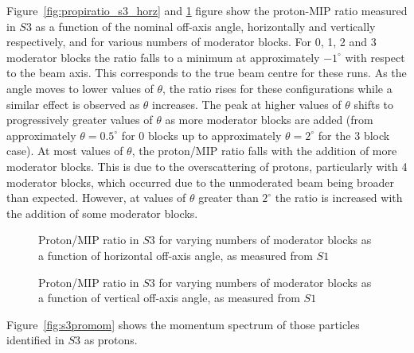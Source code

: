   Figure~\ref{fig:propiratio_s3_horz} and \ref{fig:propiratio_s3_vert} figure show the proton-MIP ratio measured in $\mathit{S3}$ as a function of the nominal off-axis angle, horizontally and vertically respectively, and for various numbers of moderator blocks.
  For 0, 1, 2 and 3 moderator blocks the ratio falls to a minimum at approximately $-1^{\circ}$ with respect to the beam axis. This corresponds to the true beam centre for these runs.
  As the angle moves to lower values of $\theta$, the ratio rises for these configurations while a similar effect is observed as $\theta$ increases.
  The peak at higher values of $\theta$ shifts to progressively greater values of $\theta$ as more moderator blocks are added (from approximately $\theta = 0.5^{\circ}$ for 0 blocks up to approximately $\theta = 2^{\circ}$ for the 3 block case).
  At most values of $\theta$, the proton/MIP ratio falls with the addition of more moderator blocks. 
  This is due to the overscattering of protons, particularly with 4 moderator blocks, which occurred due to the unmoderated beam being broader than expected.
  However, at values of $\theta$ greater than $2^{\circ}$ the ratio is increased with the addition of some moderator blocks.
  
  \begin{figure}[!ht]
    \begin{minipage}[t]{0.48\textwidth}
      \begin{adjustbox}{max totalsize={\textwidth}{.35\textheight}, center}
	
      \end{adjustbox}
      \caption{Proton/MIP ratio in $\mathit{S3}$ for varying numbers of moderator blocks as a function of horizontal off-axis angle, as measured from $\mathit{S1}$}
      \label{fig:propiratio_s3_horz}
    \end{minipage}
    \hspace{0.3cm}
    \begin{minipage}[t]{0.48\textwidth}
      \begin{adjustbox}{max totalsize={\textwidth}{.35\textheight}, center}
	
      \end{adjustbox}
      \caption{Proton/MIP ratio in $\mathit{S3}$ for varying numbers of moderator blocks as a function of vertical off-axis angle, as measured from $\mathit{S1}$}
	\label{fig:propiratio_s3_vert}
    \end{minipage}	
  \end{figure}

  Figure~\ref{fig:s3promom} shows the momentum spectrum of those particles identified in $\mathit{S3}$ as protons.

